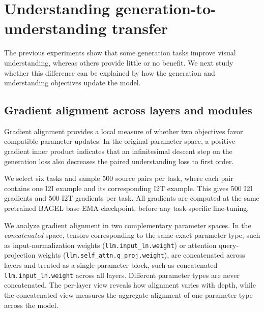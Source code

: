 \section{Understanding generation-to-understanding transfer}

The previous experiments show that some generation tasks improve visual understanding, whereas others provide little or no benefit.
We next study whether this difference can be explained by how the generation and understanding objectives update the model.

\subsection{Gradient alignment across layers and modules}

Gradient alignment provides a local measure of whether two objectives favor compatible parameter updates. In the original parameter space, a positive gradient inner product indicates that an infinitesimal descent step on the generation loss also decreases the paired understanding loss to first order.

We select six tasks and sample 500 source pairs per task, where each pair contains one I2I example and its corresponding I2T example. This gives 500 I2I gradients and 500 I2T gradients per task. All gradients are computed at the same pretrained BAGEL base EMA checkpoint, before any task-specific fine-tuning.

We analyze gradient alignment in two complementary parameter spaces. In the \emph{concatenated} space, tensors corresponding to the same exact parameter type, such as input-normalization weights
(\texttt{llm.input\_ln.weight}) or attention query-projection weights (\texttt{llm.self\_attn.q\_proj.weight}), are concatenated across layers and treated as a single parameter block, such as concatenated
\texttt{llm.input\_ln.weight} across all layers. 
Different parameter types are never concatenated.
The per-layer view reveals how alignment varies with depth, while the concatenated view measures the aggregate alignment of one parameter type across the model.

